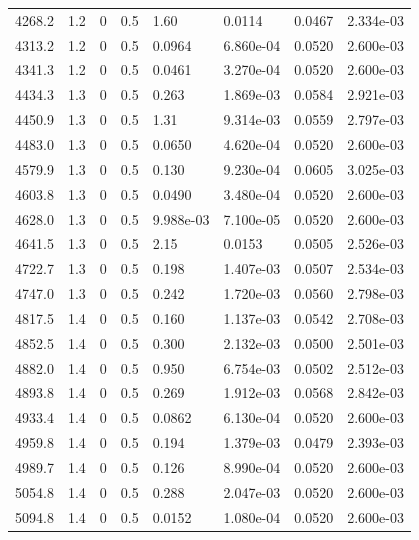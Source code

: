 \documentclass[preview]{standalone}
\begin{document}
{{{{\begin{tabular}{L{1.2cm}C{1.2cm} C{0.3cm}C{0.5cm} C{1.4cm}C{1.4cm} C{1.4cm}C{1.4cm}}
  4268.2  &   1.2  & 0     & 0.5 &  1.60  & 0.0114  & 0.0467 &  2.334e-03   \\ 
  4313.2  &   1.2  & 0     & 0.5 &  0.0964  & 6.860e-04  & 0.0520 &  2.600e-03   \\ 
  4341.3  &   1.2  & 0     & 0.5 &  0.0461  & 3.270e-04  & 0.0520 &  2.600e-03   \\ 
  4434.3  &   1.3  & 0     & 0.5 &  0.263  & 1.869e-03  & 0.0584 &  2.921e-03   \\ 
  4450.9  &   1.3  & 0     & 0.5 &  1.31  & 9.314e-03  & 0.0559 &  2.797e-03   \\ 
  4483.0  &   1.3  & 0     & 0.5 &  0.0650  & 4.620e-04  & 0.0520 &  2.600e-03   \\ 
  4579.9  &   1.3  & 0     & 0.5 &  0.130  & 9.230e-04  & 0.0605 &  3.025e-03   \\ 
  4603.8  &   1.3  & 0     & 0.5 &  0.0490  & 3.480e-04  & 0.0520 &  2.600e-03   \\ 
  4628.0  &   1.3  & 0     & 0.5 &  9.988e-03  & 7.100e-05  & 0.0520 &  2.600e-03   \\ 
  4641.5  &   1.3  & 0     & 0.5 &  2.15  & 0.0153  & 0.0505 &  2.526e-03   \\ 
  4722.7  &   1.3  & 0     & 0.5 &  0.198  & 1.407e-03  & 0.0507 &  2.534e-03   \\ 
  4747.0  &   1.3  & 0     & 0.5 &  0.242  & 1.720e-03  & 0.0560 &  2.798e-03   \\ 
  4817.5  &   1.4  & 0     & 0.5 &  0.160  & 1.137e-03  & 0.0542 &  2.708e-03   \\ 
  4852.5  &   1.4  & 0     & 0.5 &  0.300  & 2.132e-03  & 0.0500 &  2.501e-03   \\ 
  4882.0  &   1.4  & 0     & 0.5 &  0.950  & 6.754e-03  & 0.0502 &  2.512e-03   \\ 
  4893.8  &   1.4  & 0     & 0.5 &  0.269  & 1.912e-03  & 0.0568 &  2.842e-03   \\ 
  4933.4  &   1.4  & 0     & 0.5 &  0.0862  & 6.130e-04  & 0.0520 &  2.600e-03   \\ 
  4959.8  &   1.4  & 0     & 0.5 &  0.194  & 1.379e-03  & 0.0479 &  2.393e-03   \\ 
  4989.7  &   1.4  & 0     & 0.5 &  0.126  & 8.990e-04  & 0.0520 &  2.600e-03   \\ 
  5054.8  &   1.4  & 0     & 0.5 &  0.288  & 2.047e-03  & 0.0520 &  2.600e-03   \\ 
  5094.8  &   1.4  & 0     & 0.5 &  0.0152  & 1.080e-04  & 0.0520 &  2.600e-03   \\ 

\end{tabular}}}}}
\end{document}
